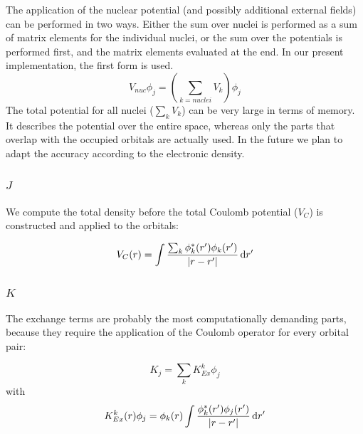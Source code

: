 \documentclass{article}
\begin{document}
The application of the nuclear potential (and possibly additional external fields) can be performed in two ways. Either the sum over nuclei is performed as a sum of matrix elements for the individual nuclei, or the sum over the potentials is performed first, and the matrix elements evaluated at the end. In our present implementation, the first form is used.
\begin{equation}
  V_{nuc} \phi_j = (\sum_{k = nuclei} V_k) \phi_j
\end{equation}
The total potential for all nuclei ($\sum_{k} V_k$) can be very large in terms of memory. It describes the potential over the entire space, whereas only the parts that overlap with the occupied orbitals are actually used. In the future we plan to adapt the accuracy according to the electronic density.




\subsubsection{$J$}

We compute the total density before the total Coulomb potential ($V_C$) is constructed and applied to the orbitals:

\begin{equation}
  V_{C}(r) = \int \frac{\sum_k \phi^*_k(r')\phi_k(r')}{|r-r'|} \,\mathrm{d} r'
\end{equation}

\subsubsection{$K$}

The exchange terms are probably the most computationally demanding parts, because they require the application of the Coulomb operator for every orbital pair:

\begin{equation}
  K_{j} = \sum_k  K_{Ex}^k \phi_j 
\end{equation}
with 
\begin{equation}
  K_{Ex}^k(r) \phi_j = \phi_k(r) \int \frac{\phi^*_k(r')\phi_j(r')}{|r-r'|} \,\mathrm{d} r'
\end{equation}
\end{document}
